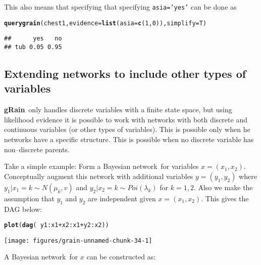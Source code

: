 \documentclass[10pt]{article}\usepackage[]{graphicx}\usepackage[]{xcolor}
\makeatletter
\def\maxwidth{ %
  \ifdim\Gin@nat@width>\linewidth
    \linewidth
  \else
    \Gin@nat@width
  \fi
}
\newcommand{\hlnum}[1]{\textcolor[rgb]{0.686,0.059,0.569}{#1}}%
\newcommand{\hlopt}[1]{\textcolor[rgb]{0,0,0}{#1}}%
\newcommand{\hlstd}[1]{\textcolor[rgb]{0.345,0.345,0.345}{#1}}%
\newcommand{\hlkwc}[1]{\textcolor[rgb]{0.333,0.667,0.333}{#1}}%
\newcommand{\hlkwd}[1]{\textcolor[rgb]{0.737,0.353,0.396}{\textbf{#1}}}%
\newenvironment{kframe}{%
 \def\at@end@of@kframe{}%
 \ifinner\ifhmode%
  \def\at@end@of@kframe{\end{minipage}}%
  \begin{minipage}{\columnwidth}%
 \fi\fi%
 \def\FrameCommand##1{\hskip\@totalleftmargin \hskip-\fboxsep
 \colorbox{shadecolor}{##1}\hskip-\fboxsep
     \hskip-\linewidth \hskip-\@totalleftmargin \hskip\columnwidth}%
 \MakeFramed {\advance\hsize-\width
   \@totalleftmargin\z@ \linewidth\hsize
   \@setminipage}}%
 {\par\unskip\endMakeFramed%
 \at@end@of@kframe}
\newenvironment{knitrout}{}{} %
\def\grbn{{\bf gRain}}
\def\code#1{{\texttt{#1}}}
\def\bn{Bayesian network}
\makeatother
\begin{document}
This also means that specifying that specifying \code{asia='yes'} can
be done as
\begin{knitrout}
\color{fgcolor}\begin{kframe}
\begin{alltt}
\hlkwd{querygrain}\hlstd{(chest1,} \hlkwc{evidence}\hlstd{=}\hlkwd{list}\hlstd{(}\hlkwc{asia}\hlstd{=}\hlkwd{c}\hlstd{(}\hlnum{1}\hlstd{,} \hlnum{0}\hlstd{)),} \hlkwc{simplify}\hlstd{=T)}
\end{alltt}
\begin{verbatim}
##      yes   no
## tub 0.05 0.95
\end{verbatim}
\end{kframe}
\end{knitrout}

\subsection{Extending networks to include other types of variables}
\label{sec:ixture}

\grbn\ only handles discrete variables with a finite state space, but
using likelihood evidence it is possible to work with networks with
both discrete and continuous variables (or other types of variables).
This is possible only when he networks have a specific structure. This
is possible when no discrete variable has non--discrete parents.

Take a simple example: Form a \bn\ for variables $x=(x_1, x_2)$. 
Conceptually augment this network with additional variables $y=(y_1, y_2)$ where
$y_1|x_1=k \sim N(\mu_k, v)$ and
$y_2|x_2=k \sim Poi(\lambda_k)$ for $k=1,2$. Also we make the assumption
that $y_1$ and $y_2$ are independent given $x=(x_1, x_2)$. This gives the DAG
below:

\begin{knitrout}
\color{fgcolor}\begin{kframe}
\begin{alltt}
\hlkwd{plot}\hlstd{(}\hlkwd{dag}\hlstd{(}\hlopt{~}\hlstd{y1}\hlopt{:}\hlstd{x1} \hlopt{+} \hlstd{x2}\hlopt{:}\hlstd{x1} \hlopt{+} \hlstd{y2}\hlopt{:}\hlstd{x2))}
\end{alltt}
\end{kframe}
\texttt{[image: figures/grain-unnamed-chunk-34-1]} 
\end{knitrout}


A \bn\ for $x$ can be constructed as:
\end{document}
